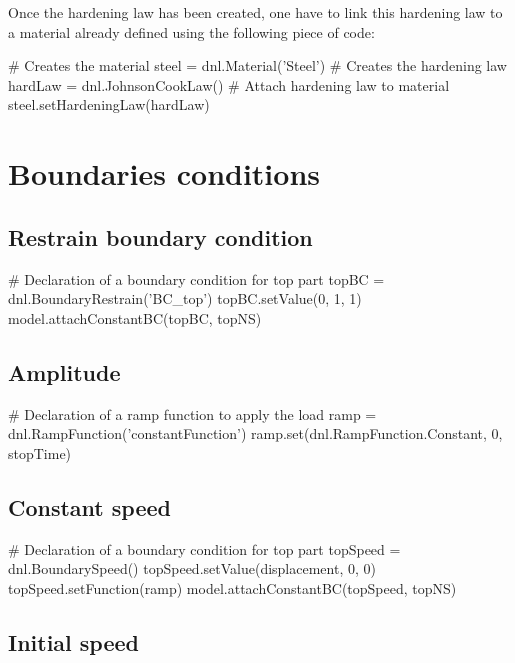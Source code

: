 Once the hardening law has been created, one have to link this hardening law to a material already defined using the following piece of code:

\begin{PythonListing}
# Creates the material
steel = dnl.Material('Steel')
# Creates the hardening law
hardLaw = dnl.JohnsonCookLaw()
# Attach hardening law to material
steel.setHardeningLaw(hardLaw)
\end{PythonListing}

\section{Boundaries conditions}

\subsection{Restrain boundary condition}

\begin{PythonListing}
# Declaration of a boundary condition for top part
topBC = dnl.BoundaryRestrain('BC_top')
topBC.setValue(0, 1, 1)
model.attachConstantBC(topBC, topNS)
\end{PythonListing}

\subsection{Amplitude}

\begin{PythonListing}
# Declaration of a ramp function to apply the load
ramp = dnl.RampFunction('constantFunction')
ramp.set(dnl.RampFunction.Constant, 0, stopTime)
\end{PythonListing}

\subsection{Constant speed}

\begin{PythonListing}
# Declaration of a boundary condition for top part
topSpeed = dnl.BoundarySpeed()
topSpeed.setValue(displacement, 0, 0)
topSpeed.setFunction(ramp)
model.attachConstantBC(topSpeed, topNS)
\end{PythonListing}

\subsection{Initial speed}

